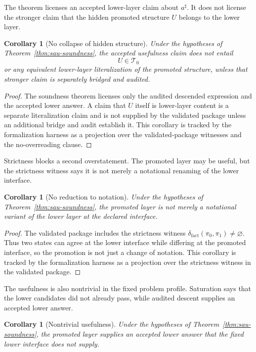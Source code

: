 \documentclass[11pt]{article}
\newtheorem{corollary}[theorem]{Corollary}
\theoremstyle{definition}
\begin{document}
The theorem licenses an accepted lower-layer claim about \(a^\sharp\).  It does
not license the stronger claim that the hidden promoted structure \(U\) belongs
to the lower layer.

\begin{corollary}[No collapse of hidden structure]
\label{cor:sau-no-collapse}
Under the hypotheses of Theorem~\ref{thm:sau-soundness}, the accepted usefulness claim does not entail
\[
U\in\mathcal T_0
\]
or any equivalent lower-layer literalization of the promoted structure, unless that stronger claim is separately bridged and audited.
\end{corollary}

\begin{proof}
The soundness theorem licenses only the audited descended expression and the
accepted lower answer.  A claim that \(U\) itself is lower-layer content is a
separate literalization claim and is not supplied by the validated package
unless an additional bridge and audit establish it.  This corollary is tracked
by the formalization harness as a projection over the validated-package
witnesses and the no-overreading clause.
\end{proof}

Strictness blocks a second overstatement.  The promoted layer may be useful, but
the strictness witness says it is not merely a notational renaming of the lower
interface.

\begin{corollary}[No reduction to notation]
\label{cor:sau-no-notation}
Under the hypotheses of Theorem~\ref{thm:sau-soundness}, the promoted layer is not merely a notational variant of the lower layer at the declared interface.
\end{corollary}

\begin{proof}
The validated package includes the strictness witness
\(\delta_{\mathrm{fact}}(\pi_0,\pi_1)\neq\varnothing\).  Thus two states can
agree at the lower interface while differing at the promoted interface, so the
promotion is not just a change of notation.  This corollary is tracked by the
formalization harness as a projection over the strictness witness in the
validated package.
\end{proof}

The usefulness is also nontrivial in the fixed problem profile.  Saturation says
that the lower candidates did not already pass, while audited descent supplies
an accepted lower answer.

\begin{corollary}[Nontrivial usefulness]
\label{cor:sau-nontrivial-usefulness}
Under the hypotheses of Theorem~\ref{thm:sau-soundness}, the promoted layer supplies an accepted lower answer that the fixed lower interface does not supply.
\end{corollary}
\end{document}
